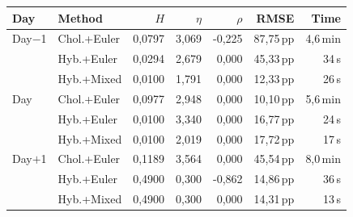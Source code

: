 \begin{tabular}{l l r r r r r}
  \toprule
  \textbf{Day} & \textbf{Method} & \textbf{$H$} & \textbf{$\eta$} & \textbf{$\rho$} & \textbf{RMSE} & \textbf{Time} \\
  \midrule
  Day$-$1 & Chol.+Euler & 0,0797 & 3,069 & -0,225 & 87,75\,pp & 4,6\,min \\
   & Hyb.+Euler & 0,0294 & 2,679 & 0,000 & 45,33\,pp & 34\,s \\
   & Hyb.+Mixed & 0,0100 & 1,791 & 0,000 & 12,33\,pp & 26\,s \\
  \addlinespace[3pt]
  Day & Chol.+Euler & 0,0977 & 2,948 & 0,000 & 10,10\,pp & 5,6\,min \\
   & Hyb.+Euler & 0,0100 & 3,340 & 0,000 & 16,77\,pp & 24\,s \\
   & Hyb.+Mixed & 0,0100 & 2,019 & 0,000 & 17,72\,pp & 17\,s \\
  \addlinespace[3pt]
  Day$+$1 & Chol.+Euler & 0,1189 & 3,564 & 0,000 & 45,54\,pp & 8,0\,min \\
   & Hyb.+Euler & 0,4900 & 0,300 & -0,862 & 14,86\,pp & 36\,s \\
   & Hyb.+Mixed & 0,4900 & 0,300 & 0,000 & 14,31\,pp & 13\,s \\
  \bottomrule
\end{tabular}